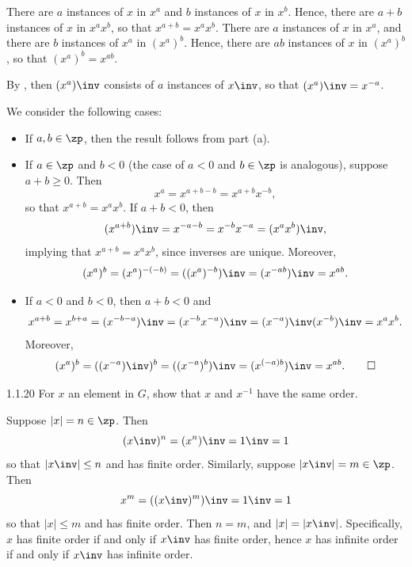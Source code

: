 \begin{solenum}[spsol]
    \item There are $a$ instances of $x$ in $x^a$ and $b$ instances of $x$ in $x^b$.
	Hence, there are $a + b$ instances of $x$ in $x^a x^b$, so that $x^{a+b} = x^a x^b$.
	There are $a$ instances of $x$ in $x^a$, and there are $b$ instances of $x^a$ in $(x^a)^b$.
	Hence, there are $ab$ instances of $x$ in $(x^a)^b$, so that $(x^a)^b = x^{ab}$.
    \item By , then $(x^a)\inv$ consists of $a$ instances of $x\inv$, so that $(x^a)\inv = x^{-a}$.
    \item We consider the following cases:
    \begin{itemize}
        \item If $a, b \in \zp$, then the result follows from part (a).
        \item If $a \in \zp$ and $b < 0$ (the case of $a < 0$ and $b \in \zp$ is analogous), suppose $a + b \geq 0$.
	Then
        \[
        	x^a = x^{a + b - b} = x^{a + b}x^{-b},
        \]
        so that $x^{a + b} = x^a x^b$.
	If $a + b < 0$, then
        \[
        	(x^{a + b})\inv = x^{-a - b} = x^{-b} x^{-a} = (x^a x^b)\inv,
        \]
        implying that $x^{a + b} = x^a x^b$, since inverses are unique.
	Moreover,
        \[
        	(x^a)^b = (x^a)^{-(-b)} = ((x^a)^{-b})\inv = (x^{-ab})\inv = x^{ab}.
        \]
        \item If $a < 0$ and $b < 0$, then $a + b < 0$ and
        \[
        	x^{a + b} = x^{b + a} = (x^{-b - a})\inv = (x^{-b} x^{-a})\inv = (x^{-a})\inv (x^{-b})\inv = x^a x^b.
        \]
        Moreover,
        \[
        	(x^a)^b = ((x^{-a})\inv)^b = ((x^{-a})^b)\inv = (x^{(-a)b})\inv = x^{ab}. \qedhere
        \]
    \end{itemize}
\end{solenum}

\begin{exercise}{1.1.20}
    For $x$ an element in $G$, show that $x$ and $x^{-1}$ have the same order.
\end{exercise}

\begin{sol}
    Suppose $|x| = n \in \zp$.
	Then
    \[
    	(x\inv)^n = (x^n)\inv = 1\inv = 1
    \]
    so that $|x\inv| \leq n$ and has finite order.
	Similarly, suppose $|x\inv| = m \in \zp$.
	Then
    \[
    	x^m = ((x\inv)^m)\inv = 1\inv = 1
    \]
    so that $|x| \leq m$ and has finite order.
	Then $n = m$, and $|x| = |x\inv|$.
	Specifically, $x$ has finite order if and only if $x\inv$ has finite order, hence $x$ has infinite order if and only if $x\inv$ has infinite order.
\end{sol}

